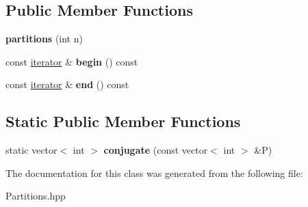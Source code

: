 \subsection*{Public Member Functions}
\begin{DoxyCompactItemize}
\item 
\hypertarget{classdscr_1_1partitions_ac6940268d5addadd953a3388987563bd}{{\bfseries partitions} (int n)}\label{classdscr_1_1partitions_ac6940268d5addadd953a3388987563bd}

\item 
\hypertarget{classdscr_1_1partitions_a4cf102e951d01057655ca99a203dcfa6}{const \hyperlink{classdscr_1_1partitions_1_1iterator}{iterator} \& {\bfseries begin} () const }\label{classdscr_1_1partitions_a4cf102e951d01057655ca99a203dcfa6}

\item 
\hypertarget{classdscr_1_1partitions_a2b93775929cabc7a8a9bdad875e68f73}{const \hyperlink{classdscr_1_1partitions_1_1iterator}{iterator} \& {\bfseries end} () const }\label{classdscr_1_1partitions_a2b93775929cabc7a8a9bdad875e68f73}

\end{DoxyCompactItemize}
\subsection*{Static Public Member Functions}
\begin{DoxyCompactItemize}
\item 
\hypertarget{classdscr_1_1partitions_a900ce455e9bffa67c28045578c69ced2}{static vector$<$ int $>$ {\bfseries conjugate} (const vector$<$ int $>$ \&P)}\label{classdscr_1_1partitions_a900ce455e9bffa67c28045578c69ced2}

\end{DoxyCompactItemize}


The documentation for this class was generated from the following file\-:\begin{DoxyCompactItemize}
\item 
Partitions.\-hpp\end{DoxyCompactItemize}
